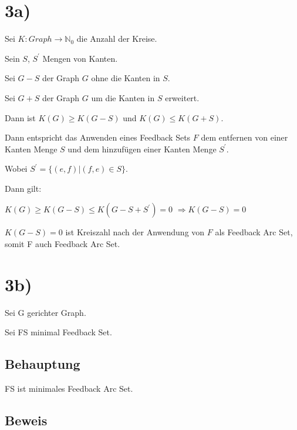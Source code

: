 \documentclass{article}
\begin{document}
\section{3a)}

Sei $K: Graph \to \mathbb{N}_{0}$ die Anzahl der Kreise.

Sein $S$, $S^{\prime}$  Mengen von Kanten.

Sei $G-S$ der Graph $G$ ohne die Kanten in $S$.

Sei $G+S$ der Graph $G$ um die Kanten in $S$ erweitert.

Dann ist $K(G) \geq K(G-S)$ und $K(G) \leq K(G+S)$.

Dann entspricht das Anwenden eines Feedback Sets $F$ dem entfernen von einer Kanten Menge $S$
und dem hinzufügen einer Kanten Menge $S^{\prime}$.

Wobei $S^{\prime} = \{(e,f)|(f,e) \in S\}$.

Dann gilt:

$K(G) \geq K(G-S) \leq K(G-S+S^{\prime}) = 0$
$\Rightarrow K(G-S) = 0$

$K(G-S) = 0$ ist Kreiszahl nach der Anwendung von $F$ als Feedback Arc Set, somit F auch Feedback Arc Set.

\section{3b)}

Sei G gerichter Graph.

Sei FS minimal Feedback Set.

\subsection{Behauptung}

FS ist minimales Feedback Arc Set.

\subsection{Beweis}
\end{document}
